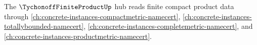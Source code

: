 The $\TychonoffFiniteProductUp$ hub reads finite compact product data through \autoref{ch:concrete-instances-compactmetric-namecert}, \autoref{ch:concrete-instances-totallybounded-namecert}, \autoref{ch:concrete-instances-completemetric-namecert}, and \autoref{ch:concrete-instances-productmetric-namecert}.

